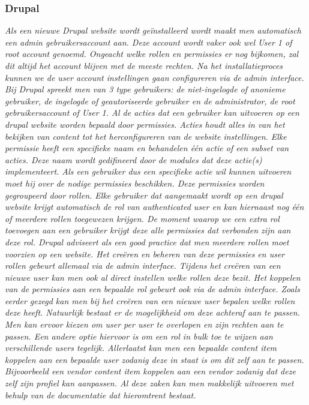 \subsubsection{Drupal}
\textit{Als een nieuwe Drupal website wordt geïnstalleerd wordt maakt men automatisch een admin gebruikersaccount aan. Deze account wordt vaker ook wel User 1 of root account genoemd. Ongeacht welke rollen en permissies er nog bijkomen, zal dit altijd het account blijven met de meeste rechten. Na het installatieproces kunnen we de user account instellingen gaan configureren via de admin interface. Bij Drupal spreekt men van 3 type gebruikers: de niet-ingelogde of anonieme gebruiker, de ingelogde of geautoriseerde gebruiker en de administrator, de root gebruikersaccount of User 1. Al de acties dat een gebruiker kan uitvoeren op een drupal website worden bepaald door permissies. Acties houdt alles in van het bekijken van content tot het herconfigureren van de website instellingen. Elke permissie heeft een specifieke naam en behandelen één actie of een subset van acties. Deze naam wordt gedifineerd door de modules dat deze actie(s) implementeert. Als een gebruiker dus een specifieke actie wil kunnen uitvoeren moet hij over de nodige permissies beschikken. Deze permissies worden gegroupeerd door rollen. Elke gebruiker dat aangemaakt wordt op een drupal website krijgt automatisch de rol van authenticated user en kan hiernaast nog één of meerdere rollen toegewezen krijgen. De moment waarop we een extra rol toevoegen aan een gebruiker krijgt deze alle permissies dat verbonden zijn aan deze rol. Drupal adviseert als een good practice dat men meerdere rollen moet voorzien op een website. Het creëren en beheren van deze permissies en user rollen gebeurt allemaal via de admin interface. Tijdens het creëren van een nieuwe user kan men ook al direct instellen welke rollen deze bezit. Het koppelen van de permissies aan een bepaalde rol gebeurt ook via de admin interface. Zoals eerder gezegd kan men bij het creëren van een nieuwe user bepalen welke rollen deze heeft. Natuurlijk bestaat er de mogelijkheid om deze achteraf aan te passen. Men kan ervoor kiezen om user per user te overlopen en zijn rechten aan te passen. Een andere optie hiervoor is om een rol in bulk toe te wijzen aan verschillende users tegelijk. Allerlaatst kan men een bepaalde content item koppelen aan een bepaalde user zodanig deze in staat is om dit zelf aan te passen. Bijvoorbeeld een vendor content item koppelen aan een vendor  zodanig dat deze zelf zijn profiel kan aanpassen. Al deze zaken kan men makkelijk uitvoeren met behulp van de documentatie dat hieromtrent bestaat.} \autocite{JoomlaCommunity2019c} 

